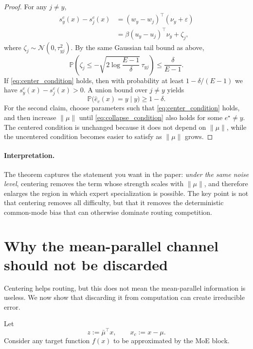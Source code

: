 \documentclass[11pt]{article}
\begin{document}
\begin{proof}
For any $j\neq y$,
\begin{align}
    s^c_y(x)-s^c_j(x)
    &= (w_y-w_j)^\top (\nu_y+\varepsilon) \\
    &= \beta (u_y-u_j)^\top \nu_y + \zeta_j,
\end{align}
where $\zeta_j\sim\mathcal N(0,\tau_{yj}^2)$. By the same Gaussian tail bound as above,
\begin{equation}
    \mathbb P\left(\zeta_j\le -\sqrt{2\log\frac{E-1}{\delta}}\,\tau_{yj}\right)
    \le \frac{\delta}{E-1}.
\end{equation}
If \eqref{eq:center_condition} holds, then with probability at least $1-\delta/(E-1)$ we have $s^c_y(x)-s^c_j(x)>0$. A union bound over $j\neq y$ yields
\begin{equation}
    \mathbb P\bigl(\hat e_c(x)=y\mid y\bigr) \ge 1-\delta.
\end{equation}
For the second claim, choose parameters such that \eqref{eq:center_condition} holds, and then increase $\|\mu\|$ until \eqref{eq:collapse_condition} also holds for some $e^\star\neq y$. The centered condition is unchanged because it does not depend on $\|\mu\|$, while the uncentered condition becomes easier to satisfy as $\|\mu\|$ grows.
\end{proof}

\paragraph{Interpretation.}
The theorem captures the statement you want in the paper: \emph{under the same noise level}, centering removes the term whose strength scales with $\|\mu\|$, and therefore enlarges the region in which expert specialization is possible. The key point is not that centering removes all difficulty, but that it removes the deterministic common-mode bias that can otherwise dominate routing competition.

\section{Why the mean-parallel channel should not be discarded}

Centering helps routing, but this does not mean the mean-parallel information is useless. We now show that discarding it from computation can create irreducible error.

Let
\begin{equation}
    z := \bar\mu^\top x,
    \qquad
    x_c := x-\mu.
\end{equation}
Consider any target function $f(x)$ to be approximated by the MoE block.
\end{document}

